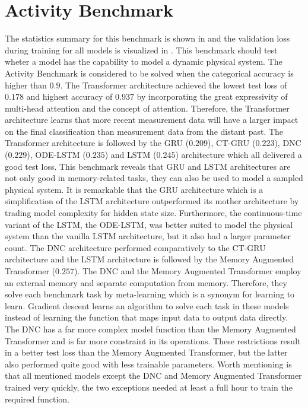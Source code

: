 \documentclass[draft,final]{vutinfth} %
\begin{document}
    \section{Activity Benchmark} \label{activity_results}
    The statistics summary for this benchmark is shown in  and the validation loss during training for all models is visualized in .
    This benchmark should test wheter a model has the capability to model a dynamic physical system.
    The Activity Benchmark is considered to be solved when the categorical accuracy is higher than $0.9$.
    The Transformer architecture achieved the lowest test loss of $0.178$ and highest accuracy of $0.937$ by incorporating the great expressivity of multi-head attention and the concept of attention.
    Therefore, the Transformer architecture learns that more recent measurement data will have a larger impact on the final classification than measurement data from the distant past.
    The Transformer architecture is followed by the GRU ($0.209$), CT-GRU ($0.223$), DNC ($0.229$), ODE-LSTM ($0.235$) and LSTM ($0.245$) architecture which all delivered a good test loss.
    This benchmark reveals that GRU and LSTM architectures are not only good in memory-related tasks, they can also be used to model a sampled physical system.
    It is remarkable that the GRU architecture which is a simplification of the LSTM architecture outperformed its mother architecture by trading model complexity for hidden state size.
    Furthermore, the continuous-time variant of the LSTM, the ODE-LSTM, was better suited to model the physical system than the vanilla LSTM architecture, but it also had a larger parameter count.
    The DNC architecture performed comparatively to the CT-GRU architecture and the LSTM architecture is followed by the Memory Augmented Transformer ($0.257$).
    The DNC and the Memory Augmented Transformer employ an external memory and separate computation from memory.
    Therefore, they solve each benchmark task by meta-learning which is a synonym for learning to learn.
    Gradient descent learns an algorithm to solve each task in these models instead of learning the function that maps input data to output data directly.
    The DNC has a far more complex model function than the Memory Augmented Transformer and is far more constraint in its operations.
    These restrictions result in a better test loss than the Memory Augmented Transformer, but the latter also performed quite good with less trainable parameters.
    Worth mentioning is that all mentioned models except the DNC and Memory Augmented Transformer trained very quickly, the two exceptions needed at least a full hour to train the required function.
\end{document}
